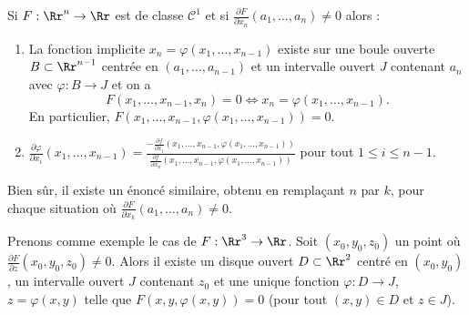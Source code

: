 \documentclass[11pt, class=report,crop=false]{standalone}
\begin{document}
\begin{theoreme}
Si $F : \Rr^n\to \Rr$ est de classe $\mathcal{C}^1$ et si $\displaystyle \frac{\partial F}{\partial x_{n}}  (a_1,\ldots,a_n) \neq 0$ alors : 
\begin{enumerate}
    \item  La fonction implicite $x_n = \varphi (x_1, \ldots, x_{n-1})$ existe sur une boule ouverte $B \subset \Rr^{n-1}$ centrée en $(a_1, \ldots,  a_{n-1})$  et un intervalle ouvert $J$ contenant $a_n$ avec $\varphi : B \to J$ et on a 
$$F(x_1,\ldots,x_{n-1},x_n)=0 \iff x_{n} = \varphi (x_{1},   \ldots,  x_{n-1}).$$
En particulier, $F(x_{1}, \ldots, x_{n-1}, \varphi(x_{1}, \ldots, x_{n-1})) = 0$.

    \item $\displaystyle \frac{\partial \varphi}{\partial x_{i}} (x_1,\ldots,x_{n-1})
     =  \frac{- \frac{\partial f}{\partial x_{i}} (x_{1},  \ldots,  x_{n-1} , \varphi(x_{1},  \ldots,  x_{n-1}))}{\frac{\partial f}{\partial x_{n}} (x_{1},  \ldots,  x_{n-1} , \varphi(x_{1},  \ldots,  x_{n-1}))}$
     pour tout $1 \le i \le n-1$.
\end{enumerate}
\end{theoreme}

Bien sûr, il existe un énoncé similaire, obtenu en remplaçant $n$ par $k$, pour chaque situation où $\displaystyle \frac{\partial F}{\partial x_{k}}  (a_1,\ldots,a_n) \neq 0$.

Prenons comme exemple le cas de $F : \Rr^3 \to \Rr$.
Soit $(x_0,y_0,z_0)$ un point où $\frac{\partial F}{\partial z} (x_0,y_0,z_0)  \neq 0$.
Alors il existe un disque ouvert $D \subset \Rr^2$ centré en $(x_0,y_0)$, un intervalle ouvert $J$ contenant $z_0$ et une unique fonction $\varphi : D \to J$,  $z=\varphi(x,y)$ telle que $F(x,y, \varphi(x,y)) = 0$ (pour tout $(x,y)\in D$ et $z\in J$).
 
\end{document}
